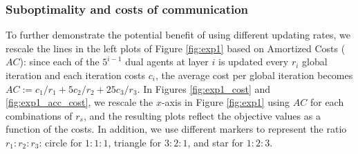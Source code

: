 \documentclass[10pt]{article}
\begin{document}




\subsubsection{Suboptimality and costs of communication}
To further demonstrate the potential benefit of using different updating rates, we rescale the lines in the left plots of Figure \ref{fig:exp1} based on Amortized Costs ($AC$): since each of the $5^{i-1}$ dual agents at layer $i$ is updated every $r_i$ global iteration and each iteration costs $c_i$, the average cost per global iteration becomes $AC:=c_1/r_1 + 5c_2/r_2 + 25c_3/r_3$. In Figures \ref{fig:exp1_cost} and \ref{fig:exp1_acc_cost}, we rescale the $x$-axis in Figure \ref{fig:exp1} using $AC$ for each combinations of $r_s$, and the resulting plots reflect the objective values as a function of the costs. In addition, we use different markers to represent the ratio $r_1:r_2:r_3$: circle for $1:1:1$, triangle for $3:2:1$, and star for $1:2:3$. 
\end{document}
